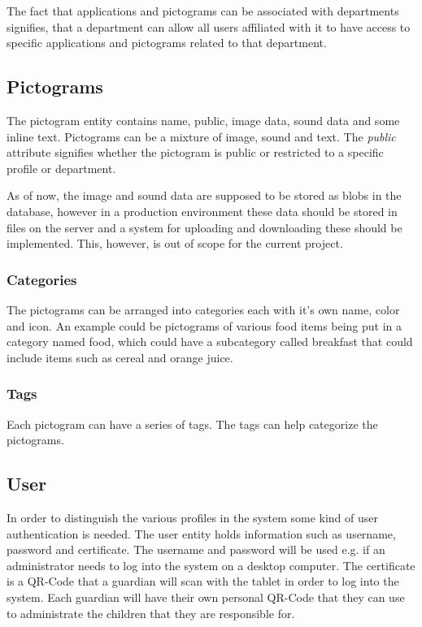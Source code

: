 The fact that applications and pictograms can be associated with departments signifies, that a department can allow all users affiliated with it to have access to specific applications and pictograms related to that department.

\subsection{Pictograms}
The pictogram entity contains name, public, image data, sound data and some inline text. 
Pictograms can be a mixture of image, sound and text. The \emph{public} attribute signifies whether the pictogram is public or restricted to a specific profile or department. 

As of now, the image and sound data are supposed to be stored as blobs in the database, however in a production environment these data should be stored in files on the server and a system for uploading and downloading these should be implemented. This, however, is out of scope for the current project. 

\subsubsection{Categories}
The pictograms can be arranged into categories each with it's own name, color and icon.
An example could be pictograms of various food items being put in a category named food, which could have a subcategory called breakfast that could include items such as cereal and orange juice.

\subsubsection{Tags}
Each pictogram can have a series of tags. The tags can help categorize the pictograms.

\subsection{User}
In order to distinguish the various profiles in the system some kind of user authentication is needed. The user entity holds information such as username, password and certificate.
The username and password will be used e.g. if an administrator needs to log into the system on a desktop computer. The certificate is a QR-Code that a guardian will scan with the tablet in order to log into the system. Each guardian will have their own personal QR-Code that they can use to administrate the children that they are responsible for.